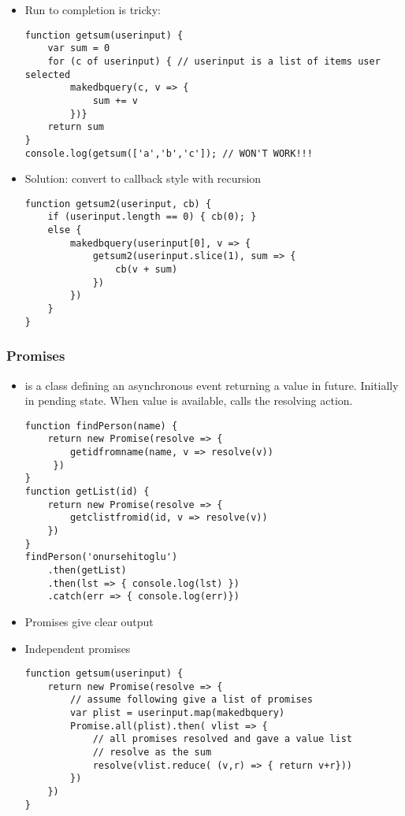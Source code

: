 \documentclass[trans,compress,xcolor=table]{beamer}
\begin{document}
\begin{frame}[fragile]
\begin{itemize}
\item Run to completion is tricky:
\begin{lstlisting}
function getsum(userinput) {
	var sum = 0
	for (c of userinput) { // userinput is a list of items user selected
		makedbquery(c, v => {
			sum += v
		})} 
	return sum
}
console.log(getsum(['a','b','c']); // WON'T WORK!!!
\end{lstlisting}
\item  Solution: convert to callback style with recursion
\begin{lstlisting}
function getsum2(userinput, cb) {
	if (userinput.length == 0) { cb(0); }
	else {
		makedbquery(userinput[0], v => {
			getsum2(userinput.slice(1), sum => {
				cb(v + sum)
			})		
		})
	}
}
\end{lstlisting}
\end{itemize}
\end{frame}

\begin{frame}[fragile]
\frametitle{Promises}
\begin{itemize}
\item {} is a class defining an asynchronous event returning a value in future. Initially in pending state. When value is available, calls the  resolving action.
\begin{lstlisting}
function findPerson(name) {
	return new Promise(resolve => {
		getidfromname(name, v => resolve(v))
	 })
}
function getList(id) {
	return new Promise(resolve => {
		getclistfromid(id, v => resolve(v))
	})
}
findPerson('onursehitoglu')
	.then(getList)
	.then(lst => { console.log(lst) })
	.catch(err => { console.log(err)})
\end{lstlisting}
\item Promises give clear output
\end{itemize}
\end{frame}

\begin{frame}[fragile]
\begin{itemize}
\item Independent promises
\begin{lstlisting}
function getsum(userinput) {
	return new Promise(resolve => {
		// assume following give a list of promises
		var plist = userinput.map(makedbquery)
		Promise.all(plist).then( vlist => {
			// all promises resolved and gave a value list
			// resolve as the sum
			resolve(vlist.reduce( (v,r) => { return v+r}))
		})
	})
}
\end{lstlisting}
\end{itemize}
\end{frame}
\end{document}
